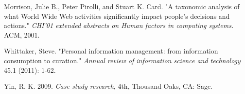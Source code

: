 \documentclass{casconpaper}
\begin{document}
{\begin{thebibliography}{9}
Morrison, Julie B., Peter Pirolli, and Stuart K. Card. "A taxonomic analysis of what World Wide Web activities significantly impact people's decisions and actions." \emph{CHI'01 extended abstracts on Human factors in computing systems.} ACM, 2001.

Whittaker, Steve. "Personal information management: from information consumption to curation." \emph{Annual review of information science and technology} 45.1 (2011): 1-62.

 Yin, R. K. 2009. \emph{Case study research}, 4th, Thousand Oaks, CA: Sage.
    
\end{thebibliography}
} %
\end{document}
